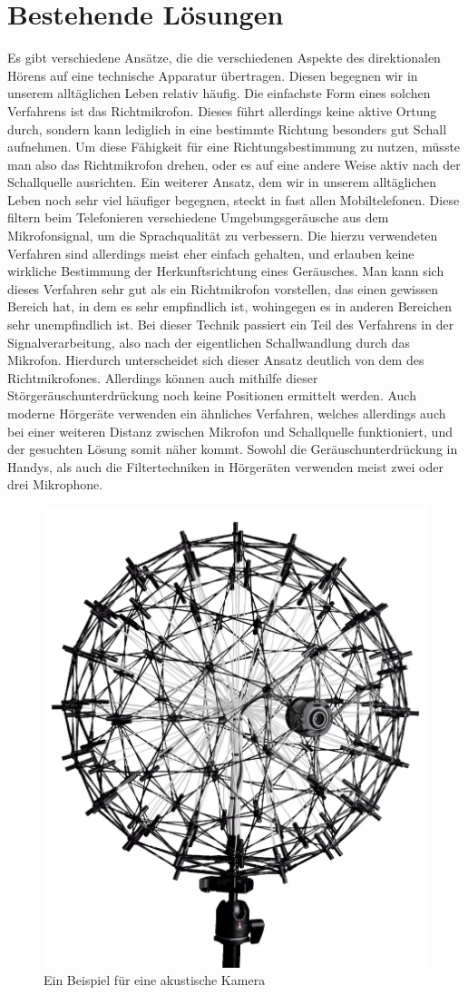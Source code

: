 \section{Bestehende Lösungen}  
  Es gibt verschiedene Ansätze, die die verschiedenen Aspekte des direktionalen Hörens auf eine technische Apparatur übertragen. Diesen begegnen wir in unserem alltäglichen Leben relativ häufig. Die einfachste Form eines solchen Verfahrens ist das Richtmikrofon. Dieses führt allerdings keine aktive Ortung durch, sondern kann lediglich in eine bestimmte Richtung besonders gut Schall aufnehmen. Um diese Fähigkeit für eine Richtungsbestimmung zu nutzen, müsste man also das Richtmikrofon drehen, oder es auf eine andere Weise aktiv nach der Schallquelle ausrichten. Ein weiterer Ansatz, dem wir in unserem alltäglichen Leben noch sehr viel häufiger begegnen, steckt in fast allen Mobiltelefonen. Diese filtern beim Telefonieren verschiedene Umgebungsgeräusche aus dem Mikrofonsignal, um die Sprachqualität zu verbessern. Die hierzu verwendeten Verfahren sind allerdings meist eher einfach gehalten, und erlauben keine wirkliche Bestimmung der Herkunftsrichtung eines Geräusches. Man kann sich dieses Verfahren sehr gut als ein Richtmikrofon vorstellen, das einen gewissen Bereich hat, in dem es sehr empfindlich ist, wohingegen es in anderen Bereichen sehr unempfindlich ist. Bei dieser Technik passiert ein Teil des Verfahrens in der Signalverarbeitung, also nach der eigentlichen Schallwandlung durch das Mikrofon. Hierdurch unterscheidet sich dieser Ansatz deutlich von dem des Richtmikrofones. Allerdings können auch mithilfe dieser Störgeräuschunterdrückung noch keine Positionen ermittelt werden. Auch moderne Hörgeräte verwenden ein ähnliches Verfahren, welches allerdings auch bei einer weiteren Distanz zwischen Mikrofon und Schallquelle funktioniert, und der gesuchten Lösung somit näher kommt. Sowohl die Geräuschunterdrückung in Handys, als auch die Filtertechniken in Hörgeräten verwenden meist zwei oder drei Mikrophone.
  \begin{figure}
    \centering
    \includegraphics[width=0.35\linewidth]{img/akusticCamera}
    \caption{Ein Beispiel für eine akustische Kamera \cite{camera}}
    \label{fig:camera}
  \end{figure}
